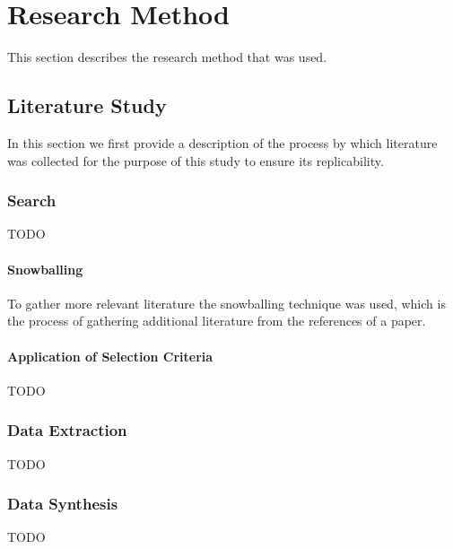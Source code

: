 \section{Research Method}
	This section describes the research method that was used.

	\subsection{Literature Study}
		In this section we first provide a description of the process by which literature was collected for the purpose of this study to ensure its replicability.

		\subsubsection{Search}
			TODO

			\paragraph{Snowballing}
				To gather more relevant literature the snowballing technique was used, which is the process of gathering additional literature from the references of a paper.

			\paragraph{Application of Selection Criteria}
				TODO
		
		\subsubsection{Data Extraction}
			TODO
		
		\subsubsection{Data Synthesis}
			TODO

